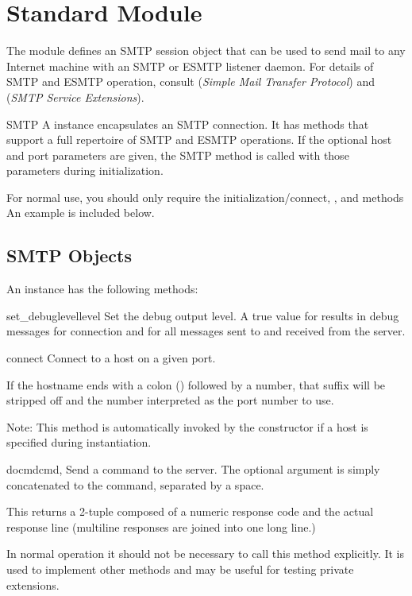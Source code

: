 \section{Standard Module }
\label{module-smtplib}

The  module defines an SMTP session object that can be
used to send mail to any Internet machine with an SMTP or ESMTP
listener daemon.  For details of SMTP and ESMTP operation, consult
 (\emph{Simple Mail Transfer Protocol}) and 
(\emph{SMTP Service Extensions}).

\begin{classdesc}{SMTP}{}
A  instance encapsulates an SMTP connection.  It has
methods that support a full repertoire of SMTP and ESMTP
operations. If the optional host and port parameters are given, the
SMTP  method is called with those parameters during
initialization.

For normal use, you should only require the initialization/connect,
, and  methods  An example is
included below.
\end{classdesc}

\subsection{SMTP Objects}
\label{SMTP-objects}

An  instance has the following methods:

\begin{methoddesc}{set_debuglevel}{level}
Set the debug output level.  A true value for  results in
debug messages for connection and for all messages sent to and
received from the server.
\end{methoddesc}

\begin{methoddesc}{connect}{}
Connect to a host on a given port.

If the hostname ends with a colon (\character{:}) followed by a
number, that suffix will be stripped off and the number interpreted as 
the port number to use.

Note:  This method is automatically invoked by the constructor if a
host is specified during instantiation.
\end{methoddesc}

\begin{methoddesc}{docmd}{cmd, }
Send a command  to the server.  The optional argument
 is simply concatenated to the command, separated by a
space.

This returns a 2-tuple composed of a numeric response code and the
actual response line (multiline responses are joined into one long
line.)

In normal operation it should not be necessary to call this method
explicitly.  It is used to implement other methods and may be useful
for testing private extensions.
\end{methoddesc}

